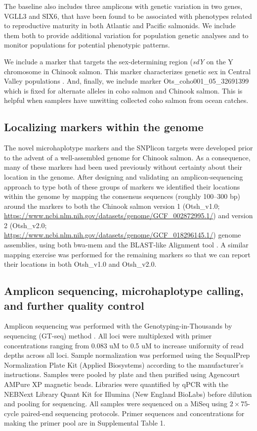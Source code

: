 The baseline also includes three amplicons with genetic variation
in two genes, VGLL3 and SIX6,
that have been found to be associated with phenotypes related to reproductive maturity in both
Atlantic \citep{barson2015sex} and Pacific \citep{waters2021heterogeneous} salmonids. We include
them both to provide additional variation for population genetic analyses and to
monitor populations for potential phenotypic patterns.

We include a marker that targets the sex-determining region ({\em sdY} on the Y chromosome in Chinook salmon.
This marker characterizes genetic sex in Central Valley populations .
And, finally, we include marker Ots\_coho001\_05\_32691399 which is fixed for alternate alleles in
coho salmon and Chinook salmon.  This is helpful when samplers have unwitting
collected coho salmon from ocean catches.

\subsection*{Localizing markers within the genome}

The novel microhaplotype markers and the SNPlicon targets were
developed prior to the advent of a well-assembled genome for Chinook salmon.
As a consequence, many of these markers had
been used previously without certainty about their location in the genome.
After designing and validating an amplicon-sequencing approach to type both of these
groups of markers we identified their locations within the genome by mapping the
consensus sequences (roughly 100--300 bp) around the markers
to both the Chinook salmon version 1 (Otsh\_v1.0; \url{https://www.ncbi.nlm.nih.gov/datasets/genome/GCF_002872995.1/}) and version 2  (Otsh\_v2.0; \url{https://www.ncbi.nlm.nih.gov/datasets/genome/GCF_018296145.1/}) genome assemblies,
using both bwa-mem \citep{bwa-mem2009} and the BLAST-like Alignment tool \citep{kent2002blat}.
A similar mapping exercise was performed for the remaining markers so that we can
report their locations in both Otsh\_v1.0 and Otsh\_v2.0.


\subsection*{Amplicon sequencing, microhaplotype calling, and further quality control}

Amplicon sequencing was performed with the Genotyping-in-Thousands by sequencing (GT-seq)
method \citep{campbell2015genotyping}. All loci were
multiplexed with primer concentrations ranging from 0.083 uM to 0.5 uM to increase
uniformity of read depths across all loci. Sample normalization was
performed using the SequalPrep Normalization Plate Kit (Applied Biosystems) according
to the manufacturer's instructions. Samples were pooled by plate
and then purified using Agencourt AMPure XP magnetic beads.
Libraries were quantified by qPCR with the NEBNext Library Quant Kit for Illumina (New
England BioLabs) before dilution and pooling for sequencing.
All samples were sequenced on a MiSeq using $2\times 75$-cycle paired-end sequencing protocols.
Primer sequences and concentrations for making the primer pool are in Supplemental Table 1.

